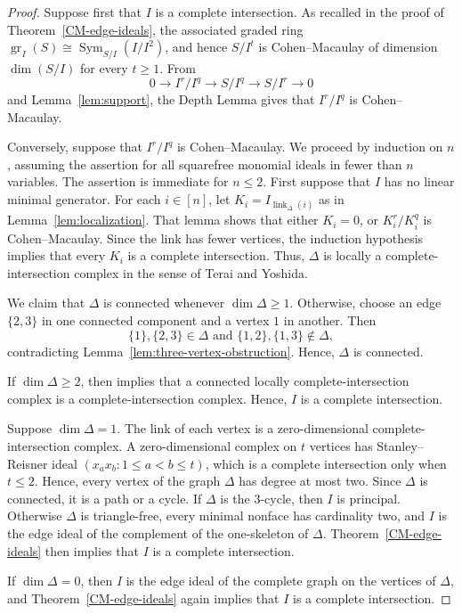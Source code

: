 \documentclass[12pt]{amsart}
\theoremstyle{plain}
\theoremstyle{definition}
\theoremstyle{remark}
\begin{document}
\begin{proof}
Suppose first that $I$ is a complete intersection. As recalled in the proof of
Theorem~\ref{CM-edge-ideals}, the associated graded ring
$\operatorname{gr}_I(S)\cong\operatorname{Sym}_{S/I}(I/I^2)$, and hence
$S/I^t$ is Cohen--Macaulay of dimension $\dim(S/I)$ for every $t\ge1$. From
$$
0\longrightarrow I^r/I^q\longrightarrow S/I^q\longrightarrow S/I^r
\longrightarrow0
$$
and Lemma~\ref{lem:support}, the Depth Lemma gives that $I^r/I^q$ is
Cohen--Macaulay.

Conversely, suppose that $I^r/I^q$ is Cohen--Macaulay. We proceed by
induction on $n$, assuming the assertion for all squarefree monomial ideals in
fewer than $n$ variables. The assertion is immediate for $n\le2$. First
suppose that $I$ has no linear minimal generator. For each $i\in[n]$, let
$K_i=I_{\operatorname{link}_\Delta(i)}$ as in Lemma~\ref{lem:localization}.
That lemma shows that either $K_i=0$, or $K_i^r/K_i^q$ is Cohen--Macaulay.
Since the link has fewer vertices, the induction hypothesis implies that every
$K_i$ is a complete intersection. Thus, $\Delta$ is locally a
complete-intersection complex in the sense of Terai and Yoshida.

We claim that $\Delta$ is connected whenever $\dim\Delta\ge1$. Otherwise,
choose an edge $\{2,3\}$ in one connected component and a vertex $1$ in
another. Then
$$
\{1\},\{2,3\}\in\Delta
\text{ and }
\{1,2\},\{1,3\}\notin\Delta,
$$
contradicting Lemma~\ref{lem:three-vertex-obstruction}. Hence, $\Delta$ is
connected.

If $\dim\Delta\ge2$, then \cite[Theorem~1.5]{TeraiYoshida} implies that
a connected locally complete-intersection complex is a complete-intersection
complex. Hence, $I$ is a complete intersection.

Suppose $\dim\Delta=1$. The link of each vertex is a zero-dimensional
complete-intersection complex. A zero-dimensional complex on $t$ vertices has
Stanley--Reisner ideal $(x_ax_b:1\le a<b\le t)$, which is a complete
intersection only when $t\le2$. Hence, every vertex of the graph $\Delta$ has
degree at most two. Since $\Delta$ is connected, it is a path or a cycle. If
$\Delta$ is the $3$-cycle, then $I$ is principal. Otherwise $\Delta$ is
triangle-free, every minimal nonface has cardinality two, and $I$ is the edge
ideal of the complement of the one-skeleton of $\Delta$. Theorem~\ref{CM-edge-ideals}
then implies that $I$ is a complete intersection.

If $\dim\Delta=0$, then $I$ is the edge ideal of the complete graph on the
vertices of $\Delta$, and Theorem~\ref{CM-edge-ideals} again implies that
$I$ is a complete intersection.


\end{proof}
\end{document}
